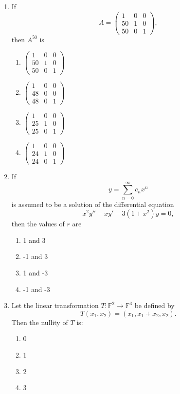 \documentclass[journal,12pt,onecolumn]{IEEEtran}
\theoremstyle{remark}
\begin{document}
\begin{enumerate}[start=14]
\item If 
\[
A = \begin{pmatrix}
1 & 0 & 0 \\
50 & 1 & 0 \\
50 & 0 & 1
\end{pmatrix},
\]
then \( A^{50} \) is

\begin{enumerate}
    \item \( 
    \begin{pmatrix}
    1 & 0 & 0 \\
    50 & 1 & 0 \\
    50 & 0 & 1 
    \end{pmatrix} 
    \)
    \item \( 
    \begin{pmatrix}
    1 & 0 & 0 \\
    48 & 0 & 0 \\
    48 & 0 & 1 
    \end{pmatrix} 
    \)
    \item \( 
    \begin{pmatrix}
    1 & 0 & 0 \\
    25 & 1 & 0 \\
    25 & 0 & 1 
    \end{pmatrix} 
    \)
    \item \( 
    \begin{pmatrix}
    1 & 0 & 0 \\
    24 & 1 & 0 \\
    24 & 0 & 1 
    \end{pmatrix} 
    \)
\end{enumerate}

\item If 
\[
y = \sum_{n=0}^{\infty} c_n x^n 
\]
is assumed to be a solution of the differential equation
\[
x^2 y'' - x y' - 3(1 + x^2) y = 0,
\]
then the values of \( r \) are

\begin{enumerate}
    \item 1 and 3
    \item -1 and 3
    \item 1 and -3
    \item -1 and -3
\end{enumerate}
\item Let the linear transformation \( T : \mathbb{F}^2 \rightarrow \mathbb{F}^3 \) be defined by 
\[ T(x_1, x_2) = (x_1, x_1 + x_2, x_2). \]
Then the nullity of \(T\) is:
\begin{enumerate}
    \item 0
    \item 1
    \item 2
    \item 3
\end{enumerate}


\end{enumerate}
\end{document}
